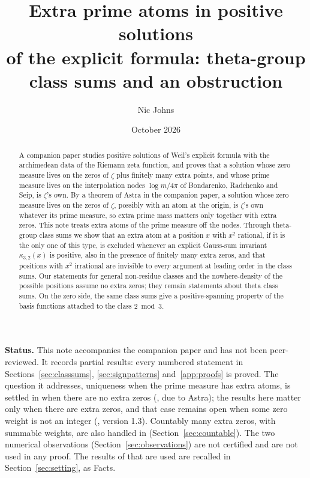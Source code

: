 \documentclass[11pt]{amsart}
\title[Extra prime atoms]{Extra prime atoms in positive solutions\\ of the explicit formula:
theta-group class sums and an obstruction}
\author{Nic Johns}
\date{October 2026}
\theoremstyle{definition}
\theoremstyle{remark}
\numberwithin{equation}{section}
\begin{document}
\begin{abstract}
A companion paper studies positive solutions of Weil's explicit formula with the archimedean data of the Riemann zeta
function, and proves that a solution whose zero measure lives on the zeros of $\zeta$ plus finitely many extra points, and
whose prime measure lives on the interpolation nodes $\log m/4\pi$ of Bondarenko, Radchenko and Seip, is $\zeta$'s own. By a
theorem of Astra in the companion paper, a solution whose zero measure lives on the zeros of $\zeta$, possibly with an atom at the
origin, is $\zeta$'s own whatever its prime measure, so extra prime mass matters only together with extra zeros. This note treats extra atoms of the
prime measure off the nodes. Through theta-group class sums we show that an extra atom at a position $x$ with $x^2$ rational, if
it is the only one of this type, is excluded whenever an explicit Gauss-sum invariant $\kappa_{3,2}(x)$ is positive, also in the
presence of finitely many extra zeros, and that positions with $x^2$ irrational are invisible to every argument at leading order
in the class sums. Our statements for general non-residue classes and the nowhere-density of the possible positions assume no extra
zeros; they remain statements about theta class sums. On the zero side,
the same class sums give a positive-spanning property of the basis functions attached to the class $2\bmod3$.
\end{abstract}

\maketitle

\noindent\textbf{Status.} This note accompanies the companion paper \cite{PaperI} and has not been peer-reviewed. It records
partial results: every numbered statement in Sections~\ref{sec:classsums}, \ref{sec:signpatterns} and~\ref{app:proofs} is proved. The
question it addresses, uniqueness when the prime measure has extra atoms, is settled in \cite{PaperI} when there are no extra zeros
(\cite[Theorem~3.6]{PaperI}, due to Astra); the results here matter only when there are extra zeros, and that case remains open
when some zero weight is not an integer (\cite[Theorem~3.11]{PaperI}, version 1.3).
Countably many extra zeros, with summable weights, are also handled in \cite{PaperI} (Section~\ref{sec:countable}). The two numerical observations
(Section~\ref{sec:observations}) are not certified and are not used in any proof. The results of \cite{PaperI} that are used are
recalled in Section~\ref{sec:setting}, as Facts.
\end{document}
